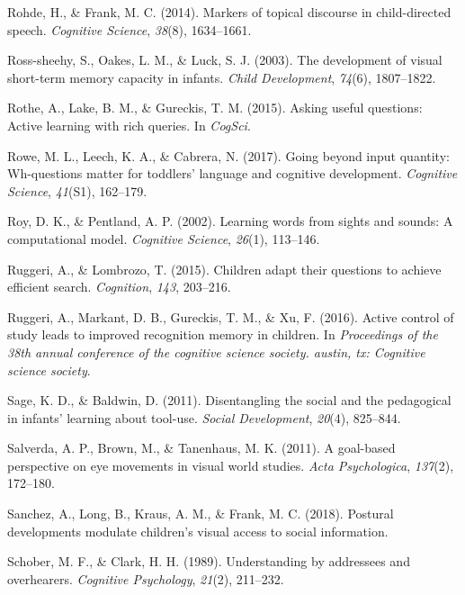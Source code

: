 \documentclass[oneside]{report}
\begin{document}
\hypertarget{ref-rohde2014markers}{}
Rohde, H., \& Frank, M. C. (2014). Markers of topical discourse in
child-directed speech. \emph{Cognitive Science}, \emph{38}(8),
1634--1661.

\hypertarget{ref-ross2003development}{}
Ross-sheehy, S., Oakes, L. M., \& Luck, S. J. (2003). The development of
visual short-term memory capacity in infants. \emph{Child Development},
\emph{74}(6), 1807--1822.

\hypertarget{ref-rothe2015asking}{}
Rothe, A., Lake, B. M., \& Gureckis, T. M. (2015). Asking useful
questions: Active learning with rich queries. In \emph{CogSci}.

\hypertarget{ref-rowe2017going}{}
Rowe, M. L., Leech, K. A., \& Cabrera, N. (2017). Going beyond input
quantity: Wh-questions matter for toddlers' language and cognitive
development. \emph{Cognitive Science}, \emph{41}(S1), 162--179.

\hypertarget{ref-roy2002learning}{}
Roy, D. K., \& Pentland, A. P. (2002). Learning words from sights and
sounds: A computational model. \emph{Cognitive Science}, \emph{26}(1),
113--146.

\hypertarget{ref-ruggeri2015children}{}
Ruggeri, A., \& Lombrozo, T. (2015). Children adapt their questions to
achieve efficient search. \emph{Cognition}, \emph{143}, 203--216.

\hypertarget{ref-ruggeri2016active}{}
Ruggeri, A., Markant, D. B., Gureckis, T. M., \& Xu, F. (2016). Active
control of study leads to improved recognition memory in children. In
\emph{Proceedings of the 38th annual conference of the cognitive science
society. austin, tx: Cognitive science society}.

\hypertarget{ref-sage2011disentangling}{}
Sage, K. D., \& Baldwin, D. (2011). Disentangling the social and the
pedagogical in infants' learning about tool-use. \emph{Social
Development}, \emph{20}(4), 825--844.

\hypertarget{ref-salverda2011goal}{}
Salverda, A. P., Brown, M., \& Tanenhaus, M. K. (2011). A goal-based
perspective on eye movements in visual world studies. \emph{Acta
Psychologica}, \emph{137}(2), 172--180.

\hypertarget{ref-sanchez2018postural}{}
Sanchez, A., Long, B., Kraus, A. M., \& Frank, M. C. (2018). Postural
developments modulate children's visual access to social information.

\hypertarget{ref-schober1989understanding}{}
Schober, M. F., \& Clark, H. H. (1989). Understanding by addressees and
overhearers. \emph{Cognitive Psychology}, \emph{21}(2), 211--232.
\end{document}
